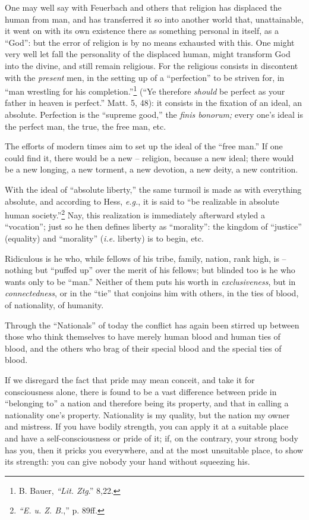 One may well say with Feuerbach and others that religion has displaced the 
human from man, and has transferred it so into another world that, 
unattainable, it went on with its own existence there as something personal in 
itself, as a ``God'': but the error of religion is by no means exhausted 
with this. One might very well let fall the personality of the displaced 
human, might transform God into the divine, and still remain religious. For 
the religious consists in discontent with the \textit{present} men, in the 
setting up of a ``perfection'' to be striven for, in ``man wrestling for 
his completion.''\footnote{B. Bauer, \textit{``Lit. Ztg}.'' 8,22.} (``Ye 
therefore \textit{should} be perfect as your father in heaven is perfect.'' 
Matt. 5, 48): it consists in the fixation of an ideal, an absolute. Perfection 
is the ``supreme good,'' the \textit{finis bonorum;} every one's ideal is 
the perfect man, the true, the free man, etc.

The efforts of modern times aim to set up the ideal of the ``free man.'' If 
one could find it, there would be a new -- religion, because a new ideal; 
there would be a new longing, a new torment, a new devotion, a new deity, a 
new contrition.

With the ideal of ``absolute liberty,'' the same turmoil is made as with 
everything absolute, and according to Hess, \textit{e.g.}, it is said to 
``be realizable in absolute human society.''\footnote{\textit{``E. u. Z. 
B.},'' p. 89ff.} Nay, this realization is immediately afterward styled a 
``vocation''; just so he then defines liberty as ``morality'': the kingdom 
of ``justice'' (equality) and ``morality'' (\textit{i.e.} liberty) is to 
begin, etc.

Ridiculous is he who, while fellows of his tribe, family, nation, rank high, 
is -- nothing but ``puffed up'' over the merit of his fellows; but blinded 
too is he who wants only to be ``man.'' Neither of them puts his worth in 
\textit{exclusiveness}, but in \textit{connectedness}, or in the ``tie'' 
that conjoins him with others, in the ties of blood, of nationality, of 
humanity.

Through the ``Nationals'' of today the conflict has again been stirred up 
between those who think themselves to have merely human blood and human ties 
of blood, and the others who brag of their special blood and the special ties 
of blood.

If we disregard the fact that pride may mean conceit, and take it for 
consciousness alone, there is found to be a vast difference between pride in 
``belonging to'' a nation and therefore being its property, and that in 
calling a nationality one's property. Nationality is my quality, but the 
nation my owner and mistress. If you have bodily strength, you can apply it at 
a suitable place and have a self-consciousness or pride of it; if, on the 
contrary, your strong body has you, then it pricks you everywhere, and at the 
most unsuitable place, to show its strength: you can give nobody your hand 
without squeezing his.

